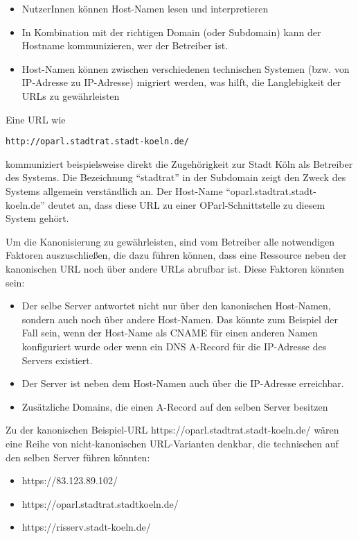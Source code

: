 \documentclass[,a4paper]{article}
\begin{document}
\begin{itemize}
\itemsep1pt\parskip0pt
\item
  NutzerInnen können Host-Namen lesen und interpretieren
\item
  In Kombination mit der richtigen Domain (oder Subdomain) kann der
  Hostname kommunizieren, wer der Betreiber ist.
\item
  Host-Namen können zwischen verschiedenen technischen Systemen (bzw.
  von IP-Adresse zu IP-Adresse) migriert werden, was hilft, die
  Langlebigkeit der URLs zu gewährleisten
\end{itemize}

Eine URL wie

\begin{verbatim}
http://oparl.stadtrat.stadt-koeln.de/
\end{verbatim}

kommuniziert beispielsweise direkt die Zugehörigkeit zur Stadt Köln als
Betreiber des Systems. Die Bezeichnung ``stadtrat'' in der Subdomain
zeigt den Zweck des Systems allgemein verständlich an. Der Host-Name
``oparl.stadtrat.stadt-koeln.de'' deutet an, dass diese URL zu einer
OParl-Schnittstelle zu diesem System gehört.

Um die Kanonisierung zu gewährleisten, sind vom Betreiber alle
notwendigen Faktoren auszuschließen, die dazu führen können, dass eine
Ressource neben der kanonischen URL noch über andere URLs abrufbar ist.
Diese Faktoren könnten sein:

\begin{itemize}
\item
  Der selbe Server antwortet nicht nur über den kanonischen Host-Namen,
  sondern auch noch über andere Host-Namen. Das könnte zum Beispiel der
  Fall sein, wenn der Host-Name als CNAME für einen anderen Namen
  konfiguriert wurde oder wenn ein DNS A-Record für die IP-Adresse des
  Servers existiert.
\item
  Der Server ist neben dem Host-Namen auch über die IP-Adresse
  erreichbar.
\item
  Zusätzliche Domains, die einen A-Record auf den selben Server besitzen
\end{itemize}

Zu der kanonischen Beispiel-URL https://oparl.stadtrat.stadt-koeln.de/
wären eine Reihe von nicht-kanonischen URL-Varianten denkbar, die
technischen auf den selben Server führen könnten:

\begin{itemize}
\itemsep1pt\parskip0pt
\item
  https://83.123.89.102/
\item
  https://oparl.stadtrat.stadtkoeln.de/
\item
  https://risserv.stadt-koeln.de/
\end{itemize}
\end{document}
